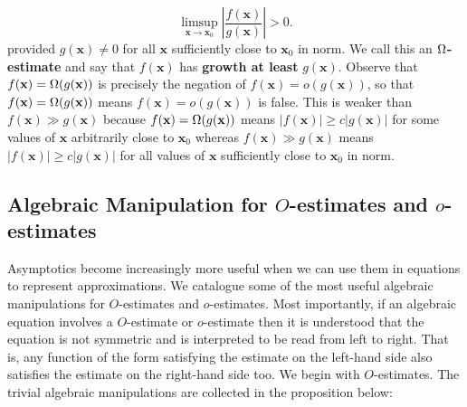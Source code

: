       \[
        \limsup_{\mathbf{x} \to \mathbf{x}_{0}}\left|\frac{f(\mathbf{x})}{g(\mathbf{x})}\right| > 0.
      \]
      provided $g(\mathbf{x}) \neq 0$ for all $\mathbf{x}$ sufficiently close to $\mathbf{x}_{0}$ in norm. We call this an \textbf{$\Omega$-estimate} and say that $f(\mathbf{x})$ has \textbf{growth at least} $g(\mathbf{x})$. Observe that $f(\mathbf{x}) = \Omega(g(\mathbf{x}))$ is precisely the negation of $f(\mathbf{x}) = o(g(\mathbf{x}))$, so that $f(\mathbf{x}) = \Omega(g(\mathbf{x}))$ means $f(\mathbf{x}) = o(g(\mathbf{x}))$ is false. This is weaker than $f(\mathbf{x}) \gg g(\mathbf{x})$ because $f(\mathbf{x}) = \Omega(g(\mathbf{x}))$ means $|f(\mathbf{x})| \ge c|g(\mathbf{x})|$ for some values of $\mathbf{x}$ arbitrarily close to $\mathbf{x}_{0}$ whereas $f(\mathbf{x}) \gg g(\mathbf{x})$ means $|f(\mathbf{x})| \ge c|g(\mathbf{x})|$ for all values of $\mathbf{x}$ sufficiently close to $\mathbf{x}_{0}$ in norm.
    \subsection*{Algebraic Manipulation for \texorpdfstring{$O$}{O}-estimates and \texorpdfstring{$o$}{o}-estimates}
      Asymptotics become increasingly more useful when we can use them in equations to represent approximations. We catalogue some of the most useful algebraic manipulations for $O$-estimates and $o$-estimates. Most importantly, if an algebraic equation involves a $O$-estimate or $o$-estimate then it is understood that the equation is not symmetric and is interpreted to be read from left to right. That is, any function of the form satisfying the estimate on the left-hand side also satisfies the estimate on the right-hand side too. We begin with $O$-estimates. The trivial algebraic manipulations are collected in the proposition below:

